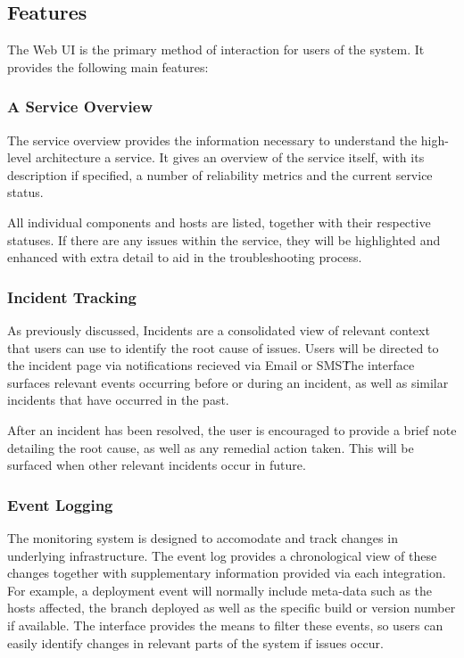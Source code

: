 \documentclass{cshonours}
\begin{document}
\subsection{Features}

The Web UI is the primary method of interaction for users of the system. It provides the following main features:

\subsubsection{A Service Overview}

The service overview provides the information necessary to understand the high-level architecture a service. It gives an overview of the service itself, with its description if specified, a number of reliability metrics and the current service status.

All individual components and hosts are listed, together with their respective statuses. If there are any issues within the service, they will be highlighted and enhanced with extra detail to aid in the troubleshooting process.

\subsubsection{Incident Tracking}

As previously discussed, Incidents are a consolidated view of relevant context that users can use to identify the root cause of issues. Users will be directed to the incident page via notifications recieved via Email or SMS\. The interface surfaces relevant events occurring before or during an incident, as well as similar incidents that have occurred in the past.

After an incident has been resolved, the user is encouraged to provide a brief note detailing the root cause, as well as any remedial action taken. This will be surfaced when other relevant incidents occur in future.

\subsubsection{Event Logging}

The monitoring system is designed to accomodate and track changes in underlying infrastructure. The event log provides a chronological view of these changes together with supplementary information provided via each integration. For example, a deployment event will normally include meta-data such as the hosts affected, the branch deployed as well as the specific build or version number if available. The interface provides the means to filter these events, so users can easily identify changes in relevant parts of the system if issues occur.
\end{document}
